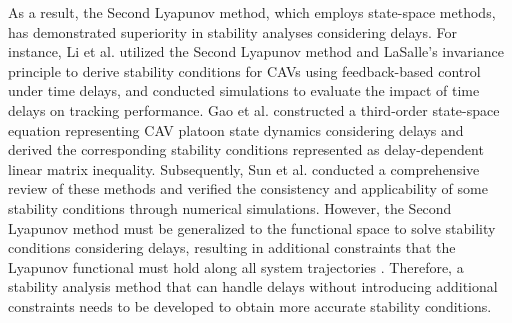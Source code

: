 \documentclass[a4paper]{cas-sc}
\begin{document}
As a result, the Second Lyapunov method, which employs state-space methods, has demonstrated superiority in stability analyses considering delays. For instance, Li et al. \citep{7554764, 8623721} utilized the Second Lyapunov method and LaSalle's invariance principle to derive stability conditions for CAVs using feedback-based control under time delays, and conducted simulations to evaluate the impact of time delays on tracking performance. Gao et al. \citep{gao2016robust} constructed a third-order state-space equation representing CAV platoon state dynamics considering delays and derived the corresponding stability conditions represented as delay-dependent linear matrix inequality. Subsequently, Sun et al. \citep{sun_stability_2018} conducted a comprehensive review of these methods and verified the consistency and applicability of some stability conditions through numerical simulations. However, the Second Lyapunov method must be generalized to the functional space to solve stability conditions considering delays, resulting in additional constraints that the Lyapunov functional must hold along all system trajectories \citep{fridman2006descriptor,fridman2014tutorial, wang2016fuzzy, lian2020dissipativity}. Therefore, a stability analysis method that can handle delays without introducing additional constraints needs to be developed to obtain more accurate stability conditions.

\end{document}
